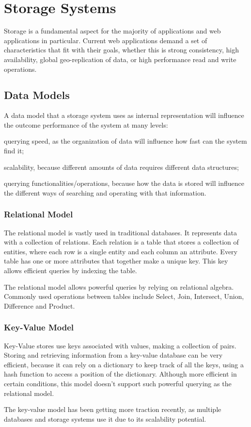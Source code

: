 \section{Storage Systems}
\label{sec:storage_systems}
Storage is a fundamental aspect for the majority of applications and web applications in particular. Current web applications demand a set of characteristics that fit with their goals, whether this is strong consistency, high availability, global geo-replication of data, or high performance read and write operations.

\subsection{Data Models}
\label{sec:data_models}
A data model that a storage system uses as internal representation will influence the outcome performance of the system at many levels: \begin{enumerate*}[(i)]
	\item querying speed, as the organization of data will influence how fast can the system find it;
	\item scalability, because different amounts of data requires different data structures;
	\item querying functionalities/operations, because how the data is stored will influence the different ways of searching and operating with that information.
\end{enumerate*}

\subsubsection{Relational Model}
\label{sec:relational_model}
The relational model\cite{relational_model} is vastly used in traditional databases. It represents data with a collection of relations. Each relation is a table that stores a collection of entities, where each row is a single entity and each column an attribute. Every table has one or more attributes that together make a unique key. This key allows efficient queries by indexing the table.\par
	The relational model allows powerful queries by relying on relational algebra. Commonly used operations between tables include Select, Join, Intersect, Union, Difference and Product.

\subsubsection{Key-Value Model}
\label{sec:key-value_model}
Key-Value stores use keys associated with values, making a collection of pairs. Storing and retrieving information from a key-value database can be very efficient, because it can rely on a dictionary to keep track of all the keys, using a hash function to access a position of the dictionary. Although more efficient in certain conditions, this model doesn't support such powerful querying as the relational model.\par
	The key-value model has been getting more traction recently, as multiple databases and storage systems use it due to its scalability potential.
	
